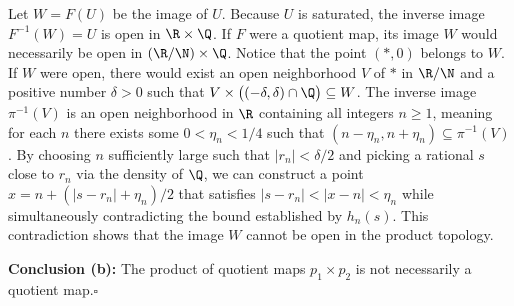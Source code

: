 Let $W=F(U)$ be the image of $U$. Because $U$ is saturated, the inverse image $F^{-1}(W)=U$ is
open in $\R\times\Q$. If $F$ were a quotient map, its image $W$ would necessarily be open in
$(\R/\N)\times\Q$. Notice that the point $(*,0)$ belongs to $W$. If $W$ were open, there would
exist an open neighborhood $V$ of $*$ in $\R/\N$ and a positive number $\delta>0$ such that
$V\times\bigl((-\delta,\delta)\cap\Q\bigr)\subseteq W$. The inverse image $\pi^{-1}(V)$ is an
open neighborhood in $\R$ containing all integers $n\ge1$, meaning for each $n$ there exists
some $0<\eta_n<1/4$ such that $(n-\eta_n,n+\eta_n)\subseteq\pi^{-1}(V)$. By choosing $n$
sufficiently large such that $|r_n|<\delta/2$ and picking a rational $s$ close to $r_n$ via the
density of $\Q$, we can construct a point $x=n+(|s-r_n|+\eta_n)/2$ that satisfies
$|s-r_n|<|x-n|<\eta_n$ while simultaneously contradicting the bound established by $h_n(s)$.
This contradiction shows that the image $W$ cannot be open in the product topology.

\textbf{Conclusion (b):} The product of quotient maps $p_1\times p_2$ is not necessarily a
quotient map.\hfill$\square$
